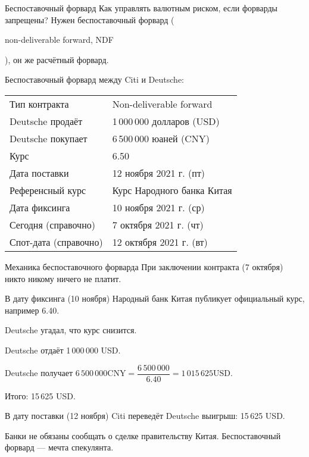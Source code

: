 \documentclass{beamer}
\newcommand{\en}[1]{\begin{otherlanguage}{english}#1\end{otherlanguage}}
\begin{document}
\begin{frame}{Беспоставочный форвард}
\justify
Как управлять валютным риском, если форварды запрещены? Нужен беспоставочный форвард (\en{non-deliverable forward, NDF}), он же расчётный форвард.

\justify
Беспоставочный форвард между Citi и Deutsche:

\begin{tabular}{l|l}
	Тип контракта 		   & Non-deliverable forward		\\
	Deutsche продаёт		& 1\,000\,000 долларов (USD)	\\
	Deutsche покупает	   & 6\,500\,000 юаней (CNY)		\\
	Курс		 		      & 6.50 						\\
	Дата поставки		   & 12 ноября 2021 г. (пт) \\
	Референсный курс	   & Курс Народного банка Китая	\\
	Дата фиксинга		   & 10 ноября 2021 г. (ср) \\
	Сегодня (справочно)	& 7 октября 2021 г. (чт) \\
	Спот-дата (справочно) & 12 октября 2021 г. (вт)
\end{tabular}
\end{frame}



\begin{frame}{Механика беспоставочного форварда}
\justify
При заключении контракта (7 октября) никто никому ничего не платит.

\justify
В дату фиксинга (10 ноября) Народный банк Китая публикует официальный курс, например 6.40.

\justify
Deutsche угадал, что курс снизится.

Deutsche отдаёт 1\,000\,000 USD.

Deutsche получает $6\,500\,000 \text{CNY} = \dfrac{6\,500\,000}{6.40} = 1\,015\,625 \text{USD}$.

Итого: 15\,625 USD.

\justify
В дату поставки (12 ноября) Citi переведёт Deutsche выигрыш: 15\,625 USD.

\justify Банки не обязаны сообщать о сделке правительству Китая. Беспоставочный форвард --- мечта спекулянта.
\end{frame}
\end{document}
